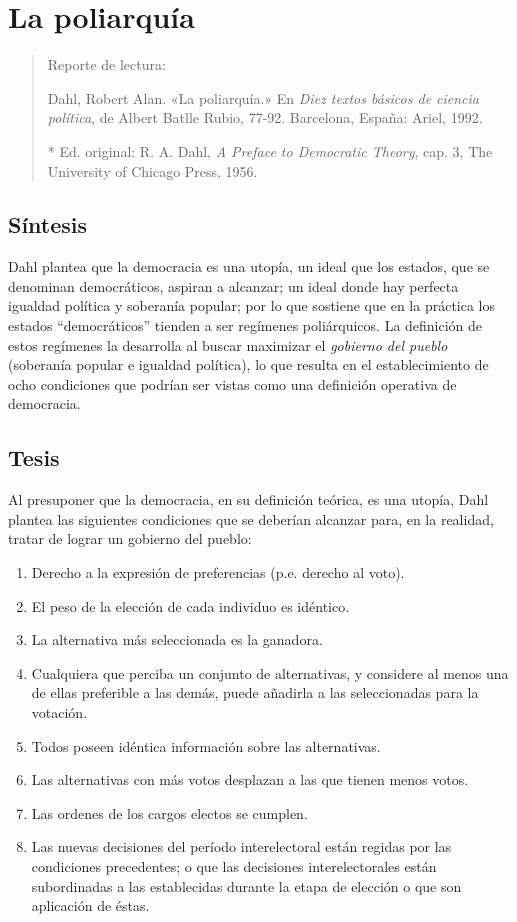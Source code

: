 \documentclass[
  letterpaper,
  DIV=11,
  numbers=noendperiod]{scrartcl}
\author{}
\date{}
\begin{document}
\section{La poliarquía}\label{poliarquia}

\begin{quote}
Reporte de lectura:

Dahl, Robert Alan. «La poliarquía.» En \emph{Diez textos básicos de
ciencia política}, de Albert Batlle Rubio, 77-92. Barcelona, España:
Ariel, 1992.

* Ed. original: R. A. Dahl, \emph{A Preface to Democratic Theory}, cap.
3, The University of Chicago Press, 1956.
\end{quote}

\subsection{Síntesis}\label{suxedntesis}

Dahl plantea que la democracia es una utopía, un ideal que los estados,
que se denominan democráticos, aspiran a alcanzar; un ideal donde hay
perfecta igualdad política y soberanía popular; por lo que sostiene que
en la práctica los estados ``democráticos'' tienden a ser regímenes
poliárquicos. La definición de estos regímenes la desarrolla al buscar
maximizar el \emph{gobierno del pueblo} (soberanía popular e igualdad
política), lo que resulta en el establecimiento de ocho condiciones que
podrían ser vistas como una definición operativa de democracia.

\subsection{Tesis}\label{tesis}

Al presuponer que la democracia, en su definición teórica, es una
utopía, Dahl plantea las siguientes condiciones que se deberían alcanzar
para, en la realidad, tratar de lograr un gobierno del pueblo:

\begin{enumerate}
\def\labelenumi{\arabic{enumi}.}
\item
  Derecho a la expresión de preferencias (p.e. derecho al voto).
\item
  El peso de la elección de cada individuo es idéntico.
\item
  La alternativa más seleccionada es la ganadora.
\item
  Cualquiera que perciba un conjunto de alternativas, y considere al
  menos una de ellas preferible a las demás, puede añadirla a las
  seleccionadas para la votación.
\item
  Todos poseen idéntica información sobre las alternativas.
\item
  Las alternativas con más votos desplazan a las que tienen menos votos.
\item
  Las ordenes de los cargos electos se cumplen.
\item
  Las nuevas decisiones del período interelectoral están regidas por las
  condiciones precedentes; o que las decisiones interelectorales están
  subordinadas a las establecidas durante la etapa de elección o que son
  aplicación de éstas.
\end{enumerate}
\end{document}
